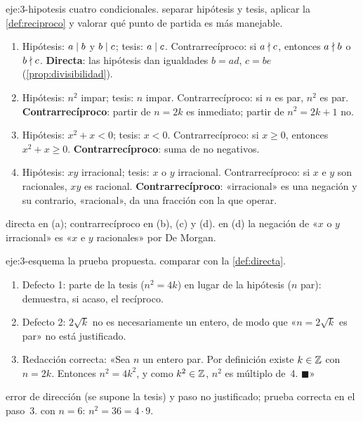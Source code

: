 \begin{solucion}{eje:3-hipotesis}
\datos cuatro condicionales.
\planteamiento separar hipótesis y tesis, aplicar la \cref{def:reciproco} y valorar qué punto de partida es más manejable.
\pasos
\begin{enumerate}[label=(\alph*)]
  \item Hipótesis: $a\mid b$ y $b\mid c$; tesis: $a\mid c$. Contrarrecíproco: si $a\nmid c$, entonces $a\nmid b$ o $b\nmid c$. \textbf{Directa}: las hipótesis dan igualdades $b=ad$, $c=be$ (\cref{prop:divisibilidad}).
  \item Hipótesis: $n^{2}$ impar; tesis: $n$ impar. Contrarrecíproco: si $n$ es par, $n^{2}$ es par. \textbf{Contrarrecíproco}: partir de $n=2k$ es inmediato; partir de $n^{2}=2k+1$ no.
  \item Hipótesis: $x^{2}+x<0$; tesis: $x<0$. Contrarrecíproco: si $x\ge 0$, entonces $x^{2}+x\ge 0$. \textbf{Contrarrecíproco}: suma de no negativos.
  \item Hipótesis: $xy$ irracional; tesis: $x$ o $y$ irracional. Contrarrecíproco: si $x$ e $y$ son racionales, $xy$ es racional. \textbf{Contrarrecíproco}: «irracional» es una negación y su contrario, «racional», da una fracción con la que operar.
\end{enumerate}
\resultado directa en (a); contrarrecíproco en (b), (c) y (d).
\comprobacion en (d) la negación de «$x$ o $y$ irracional» es «$x$ e $y$ racionales» por De Morgan.
\end{solucion}

\begin{solucion}{eje:3-esquema}
\datos la prueba propuesta.
\planteamiento comparar con la \cref{def:directa}.
\pasos
\begin{enumerate}[label=\arabic*.]
  \item Defecto 1: parte de la tesis ($n^{2}=4k$) en lugar de la hipótesis ($n$ par): demuestra, si acaso, el recíproco.
  \item Defecto 2: $2\sqrt{k}$ no es necesariamente un entero, de modo que «$n=2\sqrt k$ es par» no está justificado.
  \item Redacción correcta: «Sea $n$ un entero par. Por definición existe $k\in\mathbb{Z}$ con $n=2k$. Entonces $n^{2}=4k^{2}$, y como $k^{2}\in\mathbb{Z}$, $n^{2}$ es múltiplo de~4. $\blacksquare$»
\end{enumerate}
\resultado error de dirección (se supone la tesis) y paso no justificado; prueba correcta en el paso~3.
\comprobacion con $n=6$: $n^{2}=36=4\cdot 9$.
\end{solucion}

